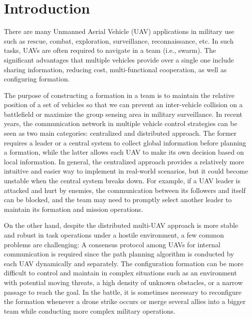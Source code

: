 \chapter{Introduction}

There are many Unmanned Aerial Vehicle (UAV) applications in military use such as rescue, combat, exploration, surveillance, reconnaissance, etc. In such tasks, UAVs are often required to navigate in a team (i.e., swarm). The significant advantages that multiple vehicles provide over a single one include sharing information, reducing cost, multi-functional cooperation, as well as configuring formation.

The purpose of constructing a formation in a team is to maintain the relative position of a set of vehicles so that we can prevent an inter-vehicle collision on a battlefield or maximize the group sensing area in military surveillance. In recent years, the communication network in multiple vehicle control strategies can be seen as two main categories: centralized and distributed approach. The former requires a leader or a central system to collect global information before planning a formation, while the latter allows each UAV to make its own decision based on local information. In general, the centralized approach provides a relatively more intuitive and easier way to implement in real-world scenarios, but it could become unstable when the central system breaks down. For example, if a UAV leader is attacked and hurt by enemies, the communication between its followers and itself can be blocked, and the team may need to promptly select another leader to maintain its formation and mission operations.

On the other hand, despite the distributed multi-UAV approach is more stable and robust in task operations under a hostile environment, a few common problems are challenging:
A consensus protocol among UAVs for internal communication is required since the path planning algorithm is conducted by each UAV dynamically and separately.
The configuration formation can be more difficult to control and maintain in complex situations such as an environment with potential moving threats, a high density of unknown obstacles, or a narrow passage to reach the goal.
In the battle, it is sometimes necessary to reconfigure the formation whenever a drone strike occurs or merge several allies into a bigger team while conducting more complex military operations. 

